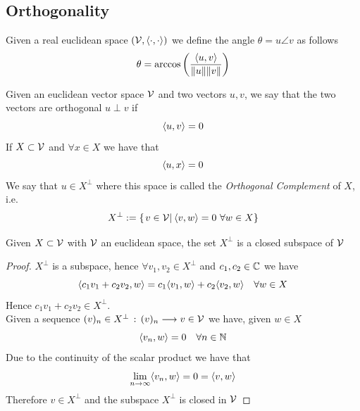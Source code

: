 \documentclass[../complete.tex]{subfiles}
\begin{document}
\subsection{Orthogonality}
\begin{dfn}[Angle]
	Given a real euclidean space $(\mathcal{V},\langle \cdot, \cdot \rangle)$ we define the angle $\theta=u\angle v$ as follows
	\begin{equation}
		\theta=\arccos\left( \frac{\langle u, v \rangle}{\norm{u}\norm{v}} \right)
		\label{eq:anglebwvec}
	\end{equation}
\end{dfn}
\begin{dfn}
	Given an euclidean vector space $\mathcal{V}$ and two vectors $u,v$, we say that the two vectors are orthogonal $u\perp v$ if
	\begin{equation}
		\langle u, v \rangle=0
		\label{eq:orthvec}
	\end{equation}
	If $X\subset\mathcal{V}$ and $\forall x\in X$ we have that
	\begin{equation*}
		\langle u, x \rangle=0
	\end{equation*}
	We say that $u\in X^{\perp}$ where this space is called the \textit{Orthogonal Complement} of $X$, i.e.
	\begin{equation}
		X^\perp:=\left\{ \left.v\in\mathcal{V}\right|_{}\langle v, w \rangle=0\ \forall w\in X \right\}
		\label{eq:xbot}
	\end{equation}
\end{dfn}
\begin{thm}
	Given $X\subset\mathcal{V}$ with $\mathcal{V}$ an euclidean space, the set $X^\perp$ is a closed subspace of $\mathcal{V}$
\end{thm}
\begin{proof}
	$X^\perp$ is a subspace, hence $\forall v_1,v_2\in X^\perp$ and $c_1,c_2\in\mathbb{C}$ we have
	\begin{equation*}
		\langle c_1v_1+c_2v_2, w \rangle=c_1\langle v_1, w \rangle+c_2\langle v_2, w \rangle\quad\forall w\in X
	\end{equation*}
	Hence $c_1v_1+c_2v_2\in X^\perp$.\\
	Given a sequence $(v)_n\in X^{\perp}\, :\, (v)_n\overset{}{\longrightarrow} v\in\mathcal{V}$ we have, given $w\in X$
	\begin{equation*}
		\langle v_n, w \rangle=0\quad\forall n\in\mathbb{N}
	\end{equation*}
	Due to the continuity of the scalar product we have that
	\begin{equation*}
		\lim_{n\to\infty}\langle v_n, w \rangle=0=\langle v, w \rangle
	\end{equation*}
	Therefore $v\in X^\perp$ and the subspace $X^\perp$ is closed in $\mathcal{V}$
\end{proof}
\end{document}
